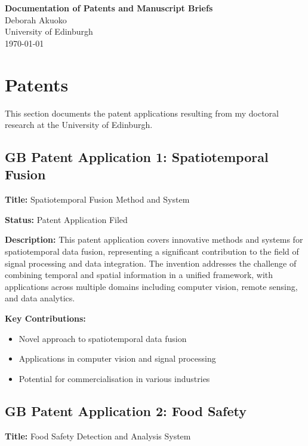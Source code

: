 \documentclass[12pt,a4paper]{article}
\begin{document}
\begin{center}
{\Large\bfseries Documentation of Patents and Manuscript Briefs}\\[0.5cm]
{\large Deborah Akuoko}\\[0.3cm]
{\normalsize University of Edinburgh}\\[0.5cm]
\today
\end{center}

\vspace{0.5cm}

\section{Patents}

This section documents the patent applications resulting from my doctoral research at the University of Edinburgh.

\subsection{GB Patent Application 1: Spatiotemporal Fusion}

\textbf{Title:} Spatiotemporal Fusion Method and System

\textbf{Status:} Patent Application Filed

\textbf{Description:} This patent application covers innovative methods and systems for spatiotemporal data fusion, representing a significant contribution to the field of signal processing and data integration. The invention addresses the challenge of combining temporal and spatial information in a unified framework, with applications across multiple domains including computer vision, remote sensing, and data analytics.

\textbf{Key Contributions:}
\begin{itemize}[leftmargin=*]
\item Novel approach to spatiotemporal data fusion
\item Applications in computer vision and signal processing
\item Potential for commercialisation in various industries
\end{itemize}

\subsection{GB Patent Application 2: Food Safety}

\textbf{Title:} Food Safety Detection and Analysis System
\end{document}

